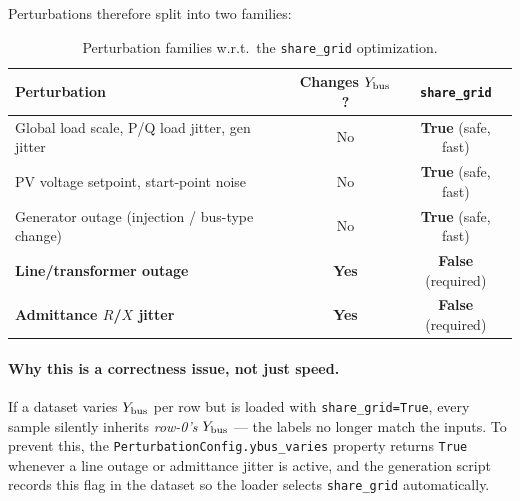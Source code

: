 \documentclass{article}
\begin{document}
Perturbations therefore split into two families:

\begin{table}[h]
\centering
\caption{Perturbation families w.r.t.\ the \texttt{share\_grid} optimization.}
\label{tab:families}
\renewcommand{\arraystretch}{1.25}
\begin{tabular}{p{5.5cm}cc}
\toprule
Perturbation & Changes $Y_{\rm bus}$? & \texttt{share\_grid} \\
\midrule
Global load scale, P/Q load jitter, gen jitter & No  & \textbf{True} (safe, fast) \\
PV voltage setpoint, start-point noise         & No  & \textbf{True} (safe, fast) \\
Generator outage (injection / bus-type change) & No  & \textbf{True} (safe, fast) \\
\textbf{Line/transformer outage}               & \textbf{Yes} & \textbf{False} (required) \\
\textbf{Admittance $R$/$X$ jitter}             & \textbf{Yes} & \textbf{False} (required) \\
\bottomrule
\end{tabular}
\end{table}

\paragraph{Why this is a correctness issue, not just speed.}
If a dataset varies $Y_{\rm bus}$ per row but is loaded with
\texttt{share\_grid=True}, every sample silently inherits \emph{row-0's}
$Y_{\rm bus}$ --- the labels no longer match the inputs.  To prevent this, the
\texttt{PerturbationConfig.ybus\_varies} property returns \texttt{True} whenever
a line outage or admittance jitter is active, and the generation script records
this flag in the dataset so the loader selects \texttt{share\_grid} automatically.
\end{document}
